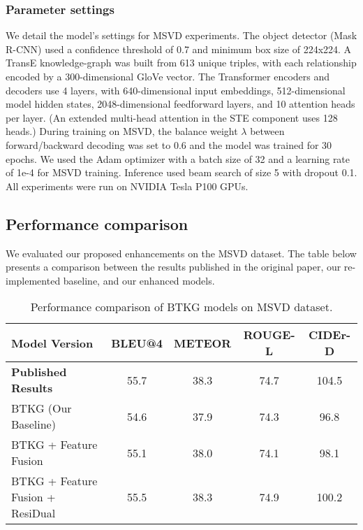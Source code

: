 \subsubsection{Parameter settings}

We detail the model's settings for MSVD experiments. The object detector (Mask R-CNN) used a confidence threshold of 0.7 and minimum box size of 224x224. A TransE knowledge-graph was built from 613 unique triples, with each relationship encoded by a 300-dimensional GloVe vector. The Transformer encoders and decoders use 4 layers, with 640-dimensional input embeddings, 512-dimensional model hidden states, 2048-dimensional feedforward layers, and 10 attention heads per layer. (An extended multi-head attention in the STE component uses 128 heads.) During training on MSVD, the balance weight $\lambda$ between forward/backward decoding was set to 0.6 and the model was trained for 30 epochs. We used the Adam optimizer with a batch size of 32 and a learning rate of 1e-4 for MSVD training. Inference used beam search of size 5 with dropout 0.1. All experiments were run on NVIDIA Tesla P100 GPUs.

\subsection{Performance comparison}

We evaluated our proposed enhancements on the MSVD dataset. The table below presents a comparison between the results published in the original paper, our re-implemented baseline, and our enhanced models.

\begin{table}[H]
  \centering
  \caption{Performance comparison of BTKG models on MSVD dataset.}
  \label{tab:model_comparison}
  \begin{tabular}{|l|c|c|c|c|}
    \hline
    \textbf{Model Version} & \textbf{BLEU@4} &
    \textbf{METEOR} & \textbf{ROUGE-L} & \textbf{CIDEr-D} \\
    \hline
    \textbf{Published Results} & 55.7 & 38.3 & 74.7 & 104.5   \\
    BTKG (Our Baseline) & 54.6 & 37.9 & 74.3 & 96.8    \\
    BTKG + Feature Fusion & 55.1 & 38.0 & 74.1 & 98.1    \\
    BTKG + Feature Fusion + ResiDual & 55.5   & 38.3   & 74.9    & 100.2   \\
    \hline
  \end{tabular}
\end{table}

